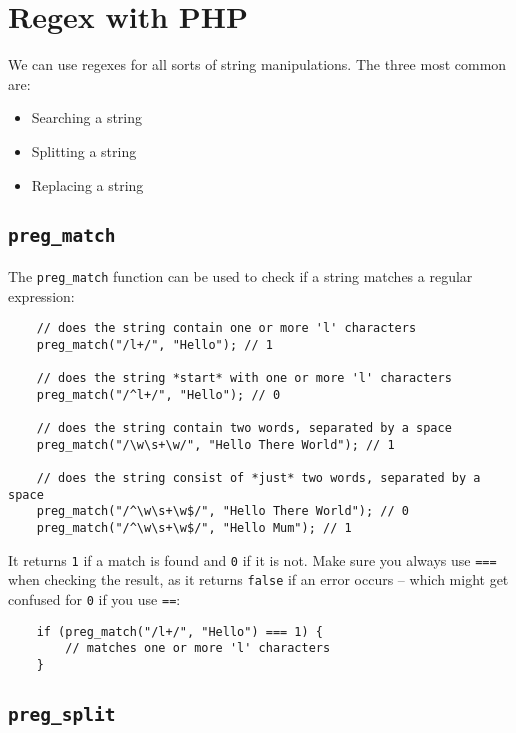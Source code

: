 \section{Regex with PHP}

We can use regexes for all sorts of string manipulations. The three most common are:

\begin{itemize}
    \item Searching a string
    \item Splitting a string
    \item Replacing a string
\end{itemize}


\subsection{\texttt{preg\_match}}

The \texttt{preg\_match} function can be used to check if a string matches a regular expression:

\begin{verbatim}
    // does the string contain one or more 'l' characters
    preg_match("/l+/", "Hello"); // 1

    // does the string *start* with one or more 'l' characters
    preg_match("/^l+/", "Hello"); // 0

    // does the string contain two words, separated by a space
    preg_match("/\w\s+\w/", "Hello There World"); // 1

    // does the string consist of *just* two words, separated by a space
    preg_match("/^\w\s+\w$/", "Hello There World"); // 0
    preg_match("/^\w\s+\w$/", "Hello Mum"); // 1
\end{verbatim}

It returns \texttt{1} if a match is found and \texttt{0} if it is not. Make sure you always use \texttt{===} when checking the result, as it returns \texttt{false} if an error occurs – which might get confused for \texttt{0} if you use \texttt{==}:

\begin{verbatim}
    if (preg_match("/l+/", "Hello") === 1) {
        // matches one or more 'l' characters
    }
\end{verbatim}

\pagebreak

\subsection{\texttt{preg\_split}}

